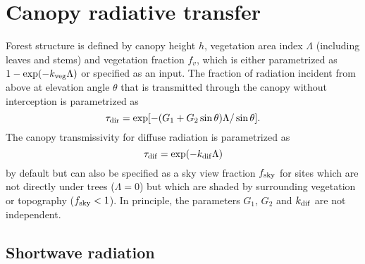 \documentclass{article}
\begin{document}
\section{Canopy radiative transfer}

Forest structure is defined by canopy height $h$, vegetation area index $\Lambda$ (including leaves and stems) and vegetation fraction $f_v$, which is either parametrized as $1-\exp(-k_{\rm veg}\Lambda)$ or specified as an input. The fraction of radiation incident from above at elevation angle $\theta$ that is transmitted through the canopy without interception is parametrized as 
\begin{equation}
\tau_{\rm dir} = \exp[-(G_1 + G_2\sin\theta)\Lambda/\sin\theta].
\end{equation}
The canopy transmissivity for diffuse radiation is parametrized as
\begin{equation}
\tau_{\rm dif} = \exp(-k_{\rm dif}\Lambda)
\label{eq:fsky}
\end{equation}
by default but can also be specified as a sky view fraction $f_{\rm sky}$ for sites which are not directly under trees ($\Lambda=0$) but which are shaded by surrounding vegetation or topography ($f_{\rm sky}<1$). In principle, the parameters $G_1$, $G_2$ and $k_{\rm dif}$ are not independent.

\subsection{Shortwave radiation}
\end{document}
